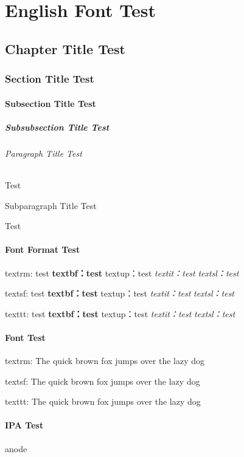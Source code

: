 \documentclass{../../PublicResources/DocClassLight}
\begin{document}
    \part{English Font Test}
    \chapter{Chapter Title Test}
    \section{Section Title Test}
    \subsection{Subsection Title Test}
    \subsubsection{Subsubsection Title Test}
    \paragraph{Paragraph Title Test}
    Test
    \subparagraph{Subparagraph Title Test}
    Test

    \subsection{Font Format Test}
    {\rmfamily textrm: test \textbf{textbf：test} \textup{textup：test} \textit{textit：test} \textsl{textsl：test}}

    {\sffamily textsf: test \textbf{textbf：test} \textup{textup：test} \textit{textit：test} \textsl{textsl：test}}

    {\ttfamily texttt: test \textbf{textbf：test} \textup{textup：test} \textit{textit：test} \textsl{textsl：test}}

    \subsection{Font Test}
    {\rmfamily textrm: The quick brown fox jumps over the lazy dog}

    {\sffamily textsf: The quick brown fox jumps over the lazy dog}

    {\ttfamily texttt: The quick brown fox jumps over the lazy dog}

    \subsection{IPA Test}
    anode 
\end{document}
